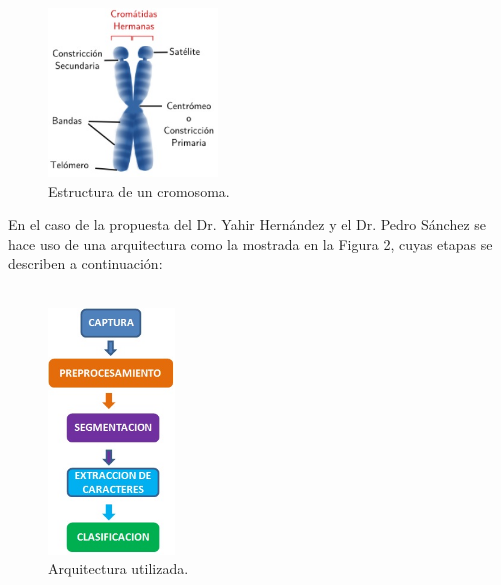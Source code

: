 \documentclass[12pt,letterpaper,titlepage]{article}
\begin{document}
\begin{figure}
  \centering
    \includegraphics[width=0.4\textwidth]{cromosoma}
  \caption{Estructura de un cromosoma.}
  \label{fig1:SW11}
\end{figure}


En el caso de la propuesta del Dr. Yahir Hernández y el Dr. Pedro Sánchez se hace uso de una arquitectura como la mostrada en la Figura 2, cuyas etapas se describen a continuación:\\\\

\begin{figure}
  \centering
    \includegraphics[width=0.3\textwidth]{EsquemaBasicoRecPatronesPrev}
  \caption{Arquitectura utilizada.}
  \label{fig1:SW}
\end{figure}
\end{document}
